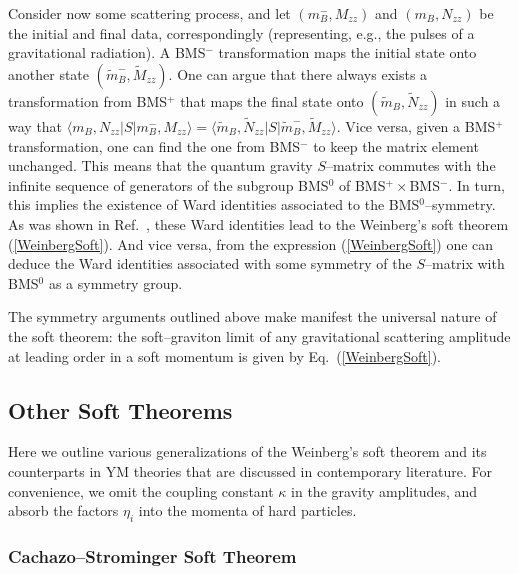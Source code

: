 \documentclass[12pt]{article}
\begin{document}
Consider now some scattering process, and let $(m_B^-,M_{zz})$ and $(m_B,N_{zz})$ be the initial and final data, correspondingly (representing, e.g., the pulses of a gravitational radiation).
A BMS$^-$ transformation maps the initial state onto another state $(\tilde{m}_B^-,\tilde{M}_{zz})$. One can argue that there always exists a transformation from BMS$^+$ that maps the final state onto $(\tilde{m}_B,\tilde{N}_{zz})$ in such a way that $\langle m_B,N_{zz}\vert S\vert m_B^-,M_{zz}\rangle=\langle \tilde{m}_B,\tilde{N}_{zz}\vert S\vert \tilde{m}_B^-,\tilde{M}_{zz}\rangle$.
Vice versa, given a BMS$^+$ transformation, one can find the one from BMS$^-$ to keep the matrix element unchanged. This means that the quantum gravity $S$--matrix commutes with the infinite sequence of generators of the subgroup BMS$^0$ of BMS$^+\times$BMS$^-$. In turn, this implies the existence of Ward identities associated to the BMS$^0$--symmetry. As was shown in Ref.~\cite{He:2014laa}, these Ward identities lead to the Weinberg's soft theorem (\ref{WeinbergSoft}). And vice versa, from the expression (\ref{WeinbergSoft}) one can deduce the Ward identities associated with some symmetry of the $S$--matrix with BMS$^0$ as a symmetry group.

The symmetry arguments outlined above make manifest the universal nature of the soft theorem: the soft--graviton limit of any gravitational scattering amplitude at leading order in a soft momentum is given by Eq.~(\ref{WeinbergSoft}).

\subsection{Other Soft Theorems}

Here we outline various generalizations of the Weinberg's soft theorem and its counterparts in YM theories that are discussed in contemporary literature. For convenience, we omit the coupling constant $\kappa$ in the gravity amplitudes, and absorb the factors $\eta_i$ into the momenta of hard particles.

\subsubsection{Cachazo--Strominger Soft Theorem}
\end{document}
